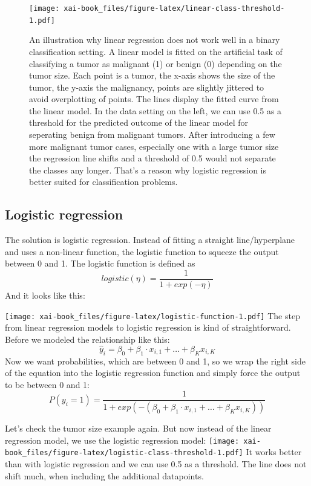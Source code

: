 \documentclass[12pt,]{krantz}
\theoremstyle{definition}
\theoremstyle{definition}
\theoremstyle{definition}
\theoremstyle{remark}
\begin{document}
\begin{figure}
\centering
\texttt{[image: xai-book\_files/figure-latex/linear-class-threshold-1.pdf]}
\caption{\label{fig:linear-class-threshold}An illustration why linear
regression does not work well in a binary classification setting. A
linear model is fitted on the artificial task of classifying a tumor as
malignant (1) or benign (0) depending on the tumor size. Each point is a
tumor, the x-axis shows the size of the tumor, the y-axis the
malignancy, points are slightly jittered to avoid overplotting of
points. The lines display the fitted curve from the linear model. In the
data setting on the left, we can use 0.5 as a threshold for the
predicted outcome of the linear model for seperating benign from
malignant tumors. After introducing a few more malignant tumor cases,
especially one with a large tumor size the regression line shifts and a
threshold of 0.5 would not separate the classes any longer. That's a
reason why logistic regression is better suited for classification
problems.}
\end{figure}

\subsection{Logistic regression}\label{logistic-regression}

The solution is logistic regression. Instead of fitting a straight
line/hyperplane and uses a non-linear function, the logistic function to
squeeze the output between 0 and 1. The logistic function is defined as
\[ logistic(\eta) = \frac{1}{1 + exp(-\eta)}\] And it looks like this:

\texttt{[image: xai-book\_files/figure-latex/logistic-function-1.pdf]}
The step from linear regression models to logistic regression is kind of
straightforward. Before we modeled the relationship like this:
\[\hat{y}_{i} = \beta_{0} + \beta_{1} \cdot x_{i,1} + \ldots + \beta_{K} x_{i,K} \]
Now we want probabilities, which are between 0 and 1, so we wrap the
right side of the equation into the logistic regression function and
simply force the output to be between 0 and 1:
\[P(y_{i}=1) =  \frac{1}{1 + exp(-(\beta_{0} + \beta_{1} \cdot x_{i,1} + \ldots + \beta_{K} x_{i,K}))}\]

Let's check the tumor size example again. But now instead of the linear
regression model, we use the logistic regression model:
\texttt{[image: xai-book\_files/figure-latex/logistic-class-threshold-1.pdf]}
It works better than with logistic regression and we can use 0.5 as a
threshold. The line does not shift much, when including the additional
datapoints.
\end{document}
